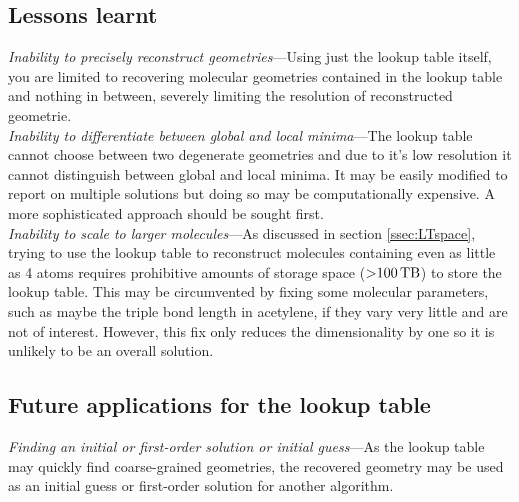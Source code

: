 \subsection{Lessons learnt}

\noindent
\emph{Inability to precisely reconstruct geometries}---Using just the lookup table itself, you are limited to recovering molecular geometries contained in the lookup table and nothing in between, severely limiting the resolution of reconstructed geometrie. \\

\noindent
\emph{Inability to differentiate between global and local minima}---The lookup table cannot choose between two degenerate geometries and due to it's low resolution it cannot distinguish between global and local minima. It may be easily modified to report on multiple solutions but doing so may be computationally expensive. A more sophisticated approach should be sought first. \\

\noindent
\emph{Inability to scale to larger molecules}---As discussed in section \ref{ssec:LTspace}, trying to use the lookup table to reconstruct molecules containing even as little as 4 atoms requires prohibitive amounts of storage space ($\SI{>100}{\tera\byte}$) to store the lookup table. This may be circumvented by fixing some molecular parameters, such as maybe the  triple bond length in acetylene, if they vary very little and are not of interest. However, this fix only reduces the dimensionality by one so it is unlikely to be an overall solution.

\subsection{Future applications for the lookup table}

\emph{Finding an initial or first-order solution or initial guess}---As the lookup table may quickly find coarse-grained geometries, the recovered geometry may be used as an initial guess or first-order solution for another algorithm. \\

